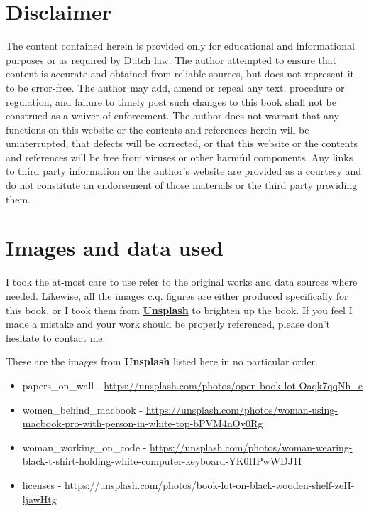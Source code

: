 \documentclass[
]{book}
\providecommand{\tightlist}{%
  \setlength{\itemsep}{0pt}\setlength{\parskip}{0pt}}
\begin{document}
\hypertarget{disclaimer}{%
\section{Disclaimer}\label{disclaimer}}

The content contained herein is provided only for educational and informational purposes or as required by Dutch law. The author attempted to ensure that content is accurate and obtained from reliable sources, but does not represent it to be error-free. The author may add, amend or repeal any text, procedure or regulation, and failure to timely post such changes to this book shall not be construed as a waiver of enforcement. The author does not warrant that any functions on this website or the contents and references herein will be uninterrupted, that defects will be corrected, or that this website or the contents and references will be free from viruses or other harmful components. Any links to third party information on the author's website are provided as a courtesy and do not constitute an endorsement of those materials or the third party providing them.

\hypertarget{images-and-data-used}{%
\section{Images and data used}\label{images-and-data-used}}

I took the at-most care to use refer to the original works and data sources where needed. Likewise, all the images c.q. figures are either produced specifically for this book, or I took them from \href{https://unsplash.com/s/photos/legal}{\textbf{Unsplash}} to brighten up the book. If you feel I made a mistake and your work should be properly referenced, please don't hesitate to contact me.

These are the images from \textbf{Unsplash} listed here in no particular order.

\begin{itemize}
\tightlist
\item
  papers\_on\_wall - \url{https://unsplash.com/photos/open-book-lot-Oaqk7qqNh_c}
\item
  women\_behind\_macbook - \url{https://unsplash.com/photos/woman-using-macbook-pro-with-person-in-white-top-bPVM4nOy0Rg}
\item
  woman\_working\_on\_code - \url{https://unsplash.com/photos/woman-wearing-black-t-shirt-holding-white-computer-keyboard-YK0HPwWDJ1I}
\item
  licenses - \url{https://unsplash.com/photos/book-lot-on-black-wooden-shelf-zeH-ljawHtg}
\end{itemize}
\end{document}
